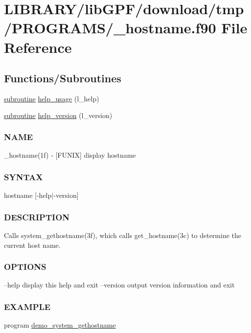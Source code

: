 \hypertarget{__hostname_8f90}{}\section{L\+I\+B\+R\+A\+R\+Y/lib\+G\+P\+F/download/tmp/\+P\+R\+O\+G\+R\+A\+M\+S/\+\_\+hostname.f90 File Reference}
\label{__hostname_8f90}
\subsection*{Functions/\+Subroutines}
\begin{DoxyCompactItemize}
\item 
\hyperlink{M__stopwatch_83_8txt_acfbcff50169d691ff02d4a123ed70482}{subroutine} \hyperlink{__hostname_8f90_a3e09a3b52ee8fb04eeb93fe5761626a8}{help\+\_\+usage} (l\+\_\+help)
\item 
\hyperlink{M__stopwatch_83_8txt_acfbcff50169d691ff02d4a123ed70482}{subroutine} \hyperlink{__hostname_8f90_a39c21619b08a3c22f19e2306efd7f766}{help\+\_\+version} (l\+\_\+version)
\begin{DoxyCompactList}\small\item\em \subsubsection*{N\+A\+ME}

\+\_\+hostname(1f) -\/ \mbox{[}F\+U\+N\+IX\mbox{]} display hostname \subsubsection*{S\+Y\+N\+T\+AX}

hostname \mbox{[}-\/help$\vert$-\/version\mbox{]} \subsubsection*{D\+E\+S\+C\+R\+I\+P\+T\+I\+ON}

Calls system\+\_\+gethostname(3f), which calls get\+\_\+hostname(3c) to determine the current host name. \subsubsection*{O\+P\+T\+I\+O\+NS}

--help display this help and exit --version output version information and exit \subsubsection*{E\+X\+A\+M\+P\+LE}\end{DoxyCompactList}\item 
program \hyperlink{__hostname_8f90_a8cf8b2c2d1597761d376d337686d3667}{demo\+\_\+system\+\_\+gethostname}
\end{DoxyCompactItemize}


